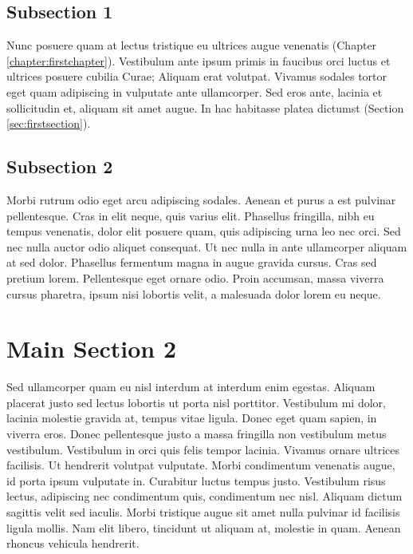 \subsection{Subsection 1}

Nunc posuere quam at lectus tristique eu ultrices augue venenatis (Chapter \ref{chapter:firstchapter}).
Vestibulum ante ipsum primis in faucibus orci luctus et ultrices posuere cubilia Curae; Aliquam erat volutpat.
Vivamus sodales tortor eget quam adipiscing in vulputate ante ullamcorper.
Sed eros ante, lacinia et sollicitudin et, aliquam sit amet augue.
In hac habitasse platea dictumst (Section \ref{sec:firstsection}).


\subsection{Subsection 2}
Morbi rutrum odio eget arcu adipiscing sodales.
Aenean et purus a est pulvinar pellentesque.
 Cras in elit neque, quis varius elit.
 Phasellus fringilla, nibh eu tempus venenatis, dolor elit posuere quam, quis adipiscing urna leo nec orci.
 Sed nec nulla auctor odio aliquet consequat.
 Ut nec nulla in ante ullamcorper aliquam at sed dolor.
 Phasellus fermentum magna in augue gravida cursus.
 Cras sed pretium lorem.
 Pellentesque eget ornare odio.
 Proin accumsan, massa viverra cursus pharetra, ipsum nisi lobortis velit, a malesuada dolor lorem eu neque.


\section{Main Section 2}

Sed ullamcorper quam eu nisl interdum at interdum enim egestas.
 Aliquam placerat justo sed lectus lobortis ut porta nisl porttitor.
 Vestibulum mi dolor, lacinia molestie gravida at, tempus vitae ligula.
 Donec eget quam sapien, in viverra eros.
 Donec pellentesque justo a massa fringilla non vestibulum metus vestibulum.
 Vestibulum in orci quis felis tempor lacinia.
 Vivamus ornare ultrices facilisis.
 Ut hendrerit volutpat vulputate.
 Morbi condimentum venenatis augue, id porta ipsum vulputate in.
 Curabitur luctus tempus justo.
 Vestibulum risus lectus, adipiscing nec condimentum quis, condimentum nec nisl.
 Aliquam dictum sagittis velit sed iaculis.
 Morbi tristique augue sit amet nulla pulvinar id facilisis ligula mollis.
 Nam elit libero, tincidunt ut aliquam at, molestie in quam.
 Aenean rhoncus vehicula hendrerit.
